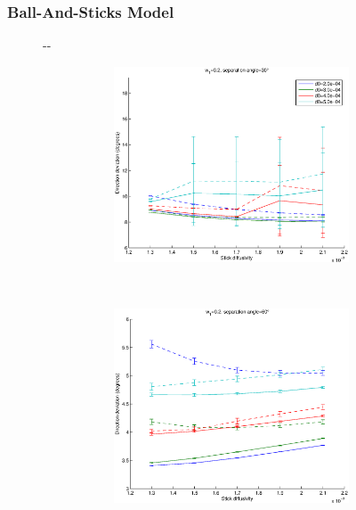 \documentclass{article}
\begin{document}
\subsubsection{Ball-And-Sticks Model}

\begin{figure}[H]
  \begin{adjustwidth}{-\oddsidemargin}{-\rightmargin}
    \begin{subfigure}{0.8\paperwidth}
      \begin{subfigure}{0.3\textwidth}
        \centering
        \includegraphics[width=\textwidth]{figures/synth_bas_weights__snr=20__w1=2__angle=30.eps}
      \end{subfigure}
      ~
      \begin{subfigure}{0.3\textwidth}
        \centering
        \includegraphics[width=\textwidth]{figures/synth_bas_weights__snr=20__w1=2__angle=60.eps}

\end{subfigure}
\end{subfigure}
\end{adjustwidth}
\end{figure}
\end{document}
